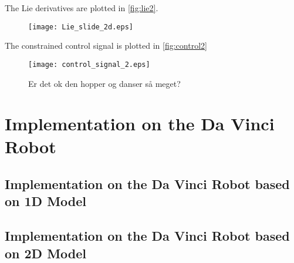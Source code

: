 The Lie derivatives are plotted in \autoref{fig:lie2}.
\begin{figure}[H]
	\center
		\texttt{[image: Lie\_slide\_2d.eps]}
	\caption{}
	\label{fig:lie2}
\end{figure}
The constrained control signal is plotted in \autoref{fig:control2}
\begin{figure}[H]
	\center
		\texttt{[image: control\_signal\_2.eps]}
	\caption{Er det ok den hopper og danser så meget?}
	\label{fig:control2}
\end{figure}

{\color{green}{Vi mangler at konkludere p\aa \,\,plottene og vise et par stykker mere, men dette er de vigtigste}}

\section{Implementation on the Da Vinci Robot}
\subsection{Implementation on the Da Vinci Robot based on 1D Model}

\subsection{Implementation on the Da Vinci Robot based on 2D Model}
